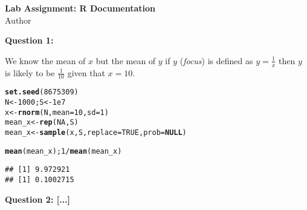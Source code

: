 \documentclass[12pt]{article}\usepackage[]{graphicx}\usepackage[]{color}
\makeatletter
\newcommand{\hlnum}[1]{\textcolor[rgb]{0.686,0.059,0.569}{#1}}%
\newcommand{\hlopt}[1]{\textcolor[rgb]{0,0,0}{#1}}%
\newcommand{\hlstd}[1]{\textcolor[rgb]{0.345,0.345,0.345}{#1}}%
\newcommand{\hlkwa}[1]{\textcolor[rgb]{0.161,0.373,0.58}{\textbf{#1}}}%
\newcommand{\hlkwb}[1]{\textcolor[rgb]{0.69,0.353,0.396}{#1}}%
\newcommand{\hlkwc}[1]{\textcolor[rgb]{0.333,0.667,0.333}{#1}}%
\newcommand{\hlkwd}[1]{\textcolor[rgb]{0.737,0.353,0.396}{\textbf{#1}}}%
\newenvironment{kframe}{%
 \def\at@end@of@kframe{}%
 \ifinner\ifhmode%
  \def\at@end@of@kframe{\end{minipage}}%
  \begin{minipage}{\columnwidth}%
 \fi\fi%
 \def\FrameCommand##1{\hskip\@totalleftmargin \hskip-\fboxsep
 \colorbox{shadecolor}{##1}\hskip-\fboxsep
     \hskip-\linewidth \hskip-\@totalleftmargin \hskip\columnwidth}%
 \MakeFramed {\advance\hsize-\width
   \@totalleftmargin\z@ \linewidth\hsize
   \@setminipage}}%
 {\par\unskip\endMakeFramed%
 \at@end@of@kframe}
\newenvironment{knitrout}{}{} %
\makeatother
\begin{document}
\begin{center}
\textbf{Lab Assignment: R Documentation}\\
Author\\
\end{center}
\begin{flushleft}

\noindent \textbf{Question 1:}

We know the mean of $x$ but the mean of $y$ if $y$ (\textit{focus}) is defined as $y = \frac{1}{x}$ then $y$ is likely to be $\frac{1}{10}$ given that $x=10$. 


\begin{knitrout}
\color{fgcolor}\begin{kframe}
\begin{alltt}

% Uses defined highlight (hl) codes for various types of R code:
\hlkwd{set.seed}\hlstd{(}\hlnum{8675309}\hlstd{)}
\hlstd{N} \hlkwb{<-} \hlnum{1000}\hlstd{; S} \hlkwb{<-} \hlnum{1e7}
\hlstd{x} \hlkwb{<-} \hlkwd{rnorm}\hlstd{(N,} \hlkwc{mean}\hlstd{=}\hlnum{10}\hlstd{,} \hlkwc{sd}\hlstd{=}\hlnum{1}\hlstd{)}
\hlstd{mean_x} \hlkwb{<-} \hlkwd{rep}\hlstd{(}\hlnum{NA}\hlstd{, S)}
\hlstd{mean_x} \hlkwb{<-} \hlkwd{sample}\hlstd{(x, S,} \hlkwc{replace}\hlstd{=}\hlnum{TRUE}\hlstd{,} \hlkwc{prob} \hlstd{=} \hlkwa{NULL}\hlstd{)}

\hlkwd{mean}\hlstd{(mean_x);} \hlnum{1}\hlopt{/}\hlkwd{mean}\hlstd{(mean_x)}
\end{alltt}
\begin{verbatim}
## [1] 9.972921
## [1] 0.1002715
\end{verbatim}
\end{kframe}
\end{knitrout}

\noindent \textbf{Question 2: [...]}


\end{flushleft}
\end{document}
